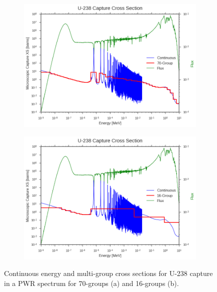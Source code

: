 \begin{figure}
\begin{subfigure}{\textwidth}
  \centering
  \includegraphics[width=0.9\linewidth]{figures/intro/u238-capture-70}
  \caption{}
\end{subfigure}
\begin{subfigure}{\textwidth}
  \centering
  \includegraphics[width=0.9\linewidth]{figures/intro/u238-capture-16}
  \caption{}
\end{subfigure}
\caption[Uranium-238 capture cross section]{Continuous energy and multi-group cross sections for U-238 capture in a PWR spectrum for 70-groups (a) and 16-groups (b).}
\label{fig:pwr-ce-mg-xs}
\end{figure}

